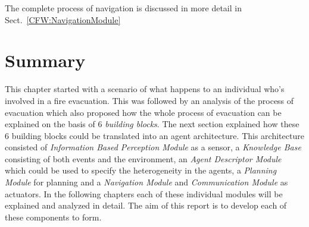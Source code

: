 The complete process of navigation is discussed in more detail in Sect.~\ref{CFW:NavigationModule}

\section{Summary}
\label{IBEVAC:Summary}

This chapter started with a scenario of what happens to an individual who's involved in a fire evacuation. This was followed by an analysis of the process of evacuation which also proposed how the whole process of evacuation can be explained on the basis of 6 \emph{building blocks}. The next section explained how these 6 building blocks could be translated into an agent architecture. This architecture consisted of \emph{Information Based Perception Module} as a sensor, a \emph{Knowledge Base} consisting of both events and the environment, an \emph{Agent Descriptor Module} which could be used to specify the heterogeneity in the agents, a \emph{Planning Module} for planning and a \emph{Navigation Module} and \emph{Communication Module} as actuators. In the following chapters each of these individual modules will be explained and analyzed in detail. The aim of this report is to develop each of these components to form.